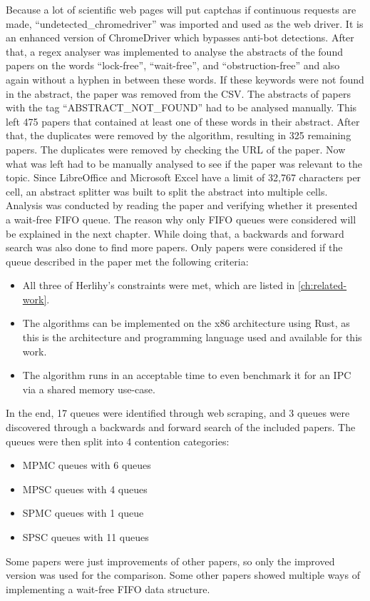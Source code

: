 Because a lot of scientific web pages will put captchas if continuous requests are made, \enquote{undetected\_chromedriver} was imported and used as the web driver. It is an enhanced version of ChromeDriver which bypasses anti-bot detections. After that, a regex analyser was implemented to analyse the abstracts of the found papers on the words \enquote{lock-free}, \enquote{wait-free}, and \enquote{obstruction-free} and also again without a hyphen in between these words. If these keywords were not found in the abstract, the paper was removed from the CSV. The abstracts of papers with the tag \enquote{ABSTRACT\_NOT\_FOUND} had to be analysed manually. This left 475 papers that contained at least one of these words in their abstract. After that, the duplicates were removed by the algorithm, resulting in 325 remaining papers. The duplicates were removed by checking the URL of the paper. Now what was left had to be manually analysed to see if the paper was relevant to the topic. Since LibreOffice and Microsoft Excel have a limit of 32,767 characters per cell, an abstract splitter was built to split the abstract into multiple cells. Analysis was conducted by reading the paper and verifying whether it presented a wait-free \ac{FIFO} queue. The reason why only \ac{FIFO} queues were considered will be explained in the next chapter. While doing that, a backwards and forward search was also done to find more papers. Only papers were considered if the queue described in the paper met the following criteria: 
\begin{itemize}
   \item All three of Herlihy's constraints were met, which are listed in \cref{ch:related-work}.
   \item The algorithms can be implemented on the x86 architecture using Rust, as this is the architecture and programming language used and available for this work.
   \item The algorithm runs in an acceptable time to even benchmark it for an \ac{IPC} via a shared memory use-case.
\end{itemize}
In the end, 17 queues were identified through web scraping, and 3 queues were discovered through a backwards and forward search of the included papers. The queues were then split into 4 contention categories:
\begin{itemize}
   \item \ac{MPMC} queues with 6 queues \cite{Kogan2011WaitFreeQueues,FeldmanDechevV2,RamalheteQueue,Verma2013Scalable,FastFetchAndAddWaitFreeQueue,wCQWaitFreeQueue}
   \item \ac{MPSC} queues with 4 queues \cite{WangCacheCoherent,jiffy,JayantiLog,Drescher2015GuardedSections}
   \item \ac{SPMC} queues with 1 queue \cite{Mateíspmc}
   \item \ac{SPSC} queues with 11 queues \cite{Lamport1983SPSCCircularBuffer,torquati2010singleproducersingleconsumerqueuessharedcache,Wang2013BQueue,MaffioneCacheAware,ffq,JayantiLog}
\end{itemize}
Some papers were just improvements of other papers, so only the improved version was used for the comparison. Some other papers showed multiple ways of implementing a wait-free \ac{FIFO} data structure.
